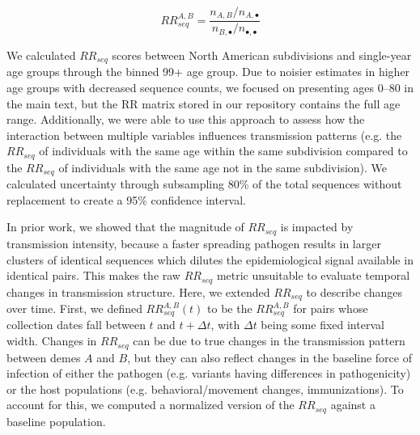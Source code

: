 \documentclass[11pt, letterpaper, oneside]{article}
\begin{document}
\[RR_{seq}^{A,B} = \frac{n_{A,B}/n_{A,\bullet}}{n_{B,\bullet}/n_{\bullet,\bullet}}\]

We calculated $RR_{seq}$ scores between North American subdivisions and single-year age groups through the binned 99+ age group.
Due to noisier estimates in higher age groups with decreased sequence counts, we focused on presenting ages 0--80 in the main text, but the RR matrix stored in our repository contains the full age range.
Additionally, we were able to use this approach to assess how  the interaction between multiple variables influences transmission patterns (e.g. the $RR_{seq}$ of individuals with the same age within the same subdivision compared to the $RR_{seq}$ of individuals with the same age not in the same subdivision).
We calculated uncertainty through subsampling 80\% of the total sequences without replacement to create a 95\% confidence interval.\autocite{tran-kiemFinescalePatternsSARSCoV22025a}

In prior work, we showed that the magnitude of $RR_{seq}$ is impacted by transmission intensity, because a faster spreading pathogen results in larger clusters of identical sequences which dilutes the epidemiological signal available in identical pairs.\autocite{tran-kiemFinescalePatternsSARSCoV22025a}
This makes the raw $RR_{seq}$ metric unsuitable to evaluate temporal changes in transmission structure.
Here, we extended $RR_{seq}$ to describe changes over time.
First, we defined $RR_{seq}^{A,B}(t)$ to be the $RR_{seq}^{A,B}$ for pairs whose collection dates fall between $t$ and $t + \Delta t$, with $\Delta t$ being some fixed interval width.
Changes in $RR_{seq}$ can be due to true changes in the transmission pattern between demes $A$ and $B$, but they can also reflect changes in the baseline force of infection of either the pathogen (e.g. variants having differences in pathogenicity) or the host populations (e.g. behavioral/movement changes, immunizations).
To account for this, we computed a normalized version of the $RR_{seq}$ against a baseline population.
\end{document}
